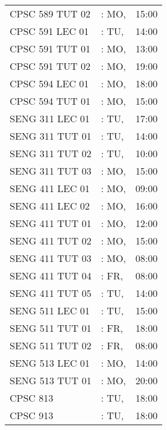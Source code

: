 \documentclass[11pt]{article}
\begin{document}
\begin{longtable}{l l r}
CPSC 589 TUT 02               &\hspace*{1.5cm}: MO,& 15:00\tabularnewline
CPSC 591 LEC 01               &\hspace*{1.5cm}: TU,& 14:00\tabularnewline
CPSC 591 TUT 01               &\hspace*{1.5cm}: MO,& 13:00\tabularnewline
CPSC 591 TUT 02               &\hspace*{1.5cm}: MO,& 19:00\tabularnewline
CPSC 594 LEC 01               &\hspace*{1.5cm}: MO,& 18:00\tabularnewline
CPSC 594 TUT 01               &\hspace*{1.5cm}: MO,& 15:00\tabularnewline
SENG 311 LEC 01               &\hspace*{1.5cm}: TU,& 17:00\tabularnewline
SENG 311 TUT 01               &\hspace*{1.5cm}: TU,& 14:00\tabularnewline
SENG 311 TUT 02               &\hspace*{1.5cm}: TU,& 10:00\tabularnewline
SENG 311 TUT 03               &\hspace*{1.5cm}: MO,& 15:00\tabularnewline
SENG 411 LEC 01               &\hspace*{1.5cm}: MO,& 09:00\tabularnewline
SENG 411 LEC 02               &\hspace*{1.5cm}: MO,& 16:00\tabularnewline
SENG 411 TUT 01               &\hspace*{1.5cm}: MO,& 12:00\tabularnewline
SENG 411 TUT 02               &\hspace*{1.5cm}: MO,& 15:00\tabularnewline
SENG 411 TUT 03               &\hspace*{1.5cm}: MO,& 08:00\tabularnewline
SENG 411 TUT 04               &\hspace*{1.5cm}: FR,& 08:00\tabularnewline
SENG 411 TUT 05               &\hspace*{1.5cm}:  TU,& 14:00\tabularnewline
SENG 511 LEC 01             &\hspace*{1.5cm}: TU,& 15:00\tabularnewline
SENG 511 TUT 01           &\hspace*{1.5cm}: FR,& 18:00\tabularnewline
SENG 511 TUT 02               &\hspace*{1.5cm}:  FR,& 08:00\tabularnewline
SENG 513 LEC 01            &\hspace*{1.5cm}: MO,& 14:00\tabularnewline
SENG 513 TUT 01          &\hspace*{1.5cm}: MO,& 20:00\tabularnewline
CPSC 813                     &\hspace*{1.5cm}: TU,& 18:00\tabularnewline
CPSC 913                     &\hspace*{1.5cm}: TU,& 18:00\tabularnewline
\end{longtable}
\end{document}
